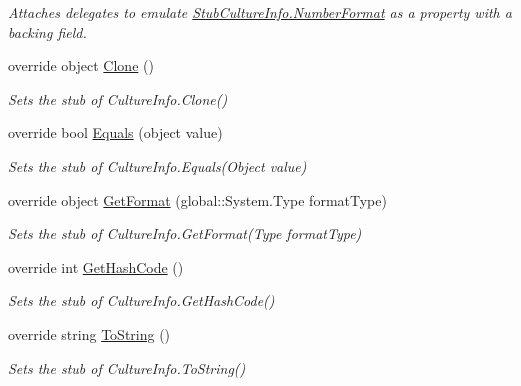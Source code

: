 \begin{DoxyCompactItemize}
\begin{DoxyCompactList}\small\item\em Attaches delegates to emulate \hyperlink{class_system_1_1_globalization_1_1_fakes_1_1_stub_culture_info_a0a75c5714e81adad558c8c79e43da5ac}{Stub\-Culture\-Info.\-Number\-Format} as a property with a backing field.\end{DoxyCompactList}\item 
override object \hyperlink{class_system_1_1_globalization_1_1_fakes_1_1_stub_culture_info_a3db8ec7421d60a3dbfec6f2afd6f4174}{Clone} ()
\begin{DoxyCompactList}\small\item\em Sets the stub of Culture\-Info.\-Clone()\end{DoxyCompactList}\item 
override bool \hyperlink{class_system_1_1_globalization_1_1_fakes_1_1_stub_culture_info_a231df3d3da83d546d18a2aae6b37e5e8}{Equals} (object value)
\begin{DoxyCompactList}\small\item\em Sets the stub of Culture\-Info.\-Equals(\-Object value)\end{DoxyCompactList}\item 
override object \hyperlink{class_system_1_1_globalization_1_1_fakes_1_1_stub_culture_info_a36c748c66a17cf7076a6d271bb0703f2}{Get\-Format} (global\-::\-System.\-Type format\-Type)
\begin{DoxyCompactList}\small\item\em Sets the stub of Culture\-Info.\-Get\-Format(\-Type format\-Type)\end{DoxyCompactList}\item 
override int \hyperlink{class_system_1_1_globalization_1_1_fakes_1_1_stub_culture_info_a51106fd6b0fb1ee6f8e328ef28d7b0ab}{Get\-Hash\-Code} ()
\begin{DoxyCompactList}\small\item\em Sets the stub of Culture\-Info.\-Get\-Hash\-Code()\end{DoxyCompactList}\item 
override string \hyperlink{class_system_1_1_globalization_1_1_fakes_1_1_stub_culture_info_ad3f3a0203de644f25a9f9b7188c34eaa}{To\-String} ()
\begin{DoxyCompactList}\small\item\em Sets the stub of Culture\-Info.\-To\-String()\end{DoxyCompactList}\end{DoxyCompactItemize}
